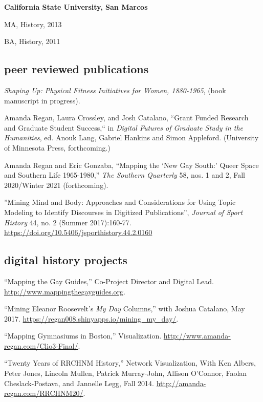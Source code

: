 \documentclass[11pt]{article}
\begin{document}
\vspace{0.05in}

\textbf{California State University, San Marcos}

\hfill\begin{minipage}{6.25in}
MA, History, 2013

\vspace{0.10in}
BA, History, 2011


\end{minipage}


\subsection{peer reviewed publications}\label{peer-reviewed}

\emph{Shaping Up: Physical Fitness Initiatives for Women, 1880-1965}, (book manuscript in progress).

Amanda Regan, Laura Crossley, and Josh Catalano, ``Grant Funded Research and Graduate Student Success,`` in \emph{Digital Futures of Graduate Study in the Humanities}, ed. Anouk Lang, Gabriel Hankins and Simon Appleford. (University of Minnesota Press, forthcoming.)

Amanda Regan and Eric Gonzaba, ``Mapping the `New Gay South:' Queer Space and Southern Life 1965-1980,'' \emph{The Southern Quarterly} 58, nos. 1 and 2, Fall 2020/Winter 2021 (forthcoming).

''Mining Mind and Body: Approaches and Considerations for Using Topic Modeling to Identify Discourses in Digitized Publications'', \emph{Journal of Sport History} 44, no. 2 (Summer 2017):160-77. \url{https://doi.org/10.5406/jsporthistory.44.2.0160}

\subsection{digital history projects}
``Mapping the Gay Guides,'' Co-Project Director and Digital Lead. \url{http://www.mappingthegayguides.org}.

``Mining Eleanor Roosevelt's \emph{My Day} Columns,'' with Joshua Catalano, May 2017. \url{https://regan008.shinyapps.io/mining_my_day/}.

``Mapping Gymnasiums in Boston,'' Visualization. \url{http://www.amanda-regan.com/Clio3-Final/}.

``Twenty Years of RRCHNM History,'' Network Visualization, With Ken Albers, Peter Jones, Lincoln Mullen, Patrick Murray-John, Allison O’Connor, Faolan Cheslack-Postava, and Jannelle Legg, Fall 2014. \url{http://amanda-regan.com/RRCHNM20/}.
\end{document}
